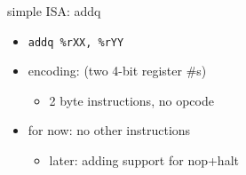 \begin{frame}[fragile,label=AddIntro]{simple ISA: addq}
    \instrEncodingStyles
    \begin{itemize}
        \item \lstinline|addq %rXX, %rYY|
        \item encoding:     (two 4-bit register \#s)
            \begin{itemize}
            \item 2 byte instructions, no opcode
            \end{itemize}
        \vspace{.5cm}
        \item for now: no other instructions
            \begin{itemize}
            \item later: adding support for nop+halt
            \end{itemize}
    \end{itemize}
\end{frame}
